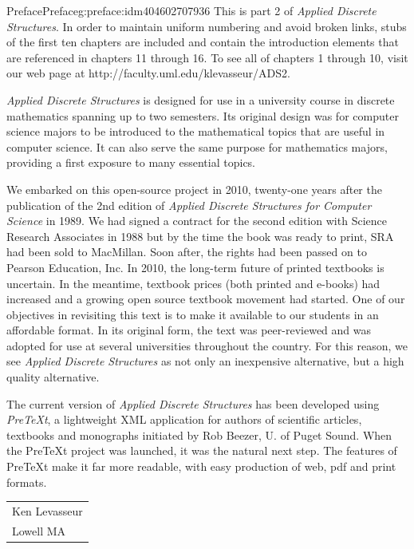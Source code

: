 \documentclass[twoside,10pt,]{book}
\numberwithin{equation}{section}
\begin{document}
\begin{preface}{Preface}{}{Preface}{}{}{g:preface:idm404602707936}
This is part 2 of \emph{Applied Discrete Structures}.  In order to maintain uniform numbering and avoid broken links, stubs of the first ten chapters are included and contain the introduction  elements that are referenced in chapters 11 through 16.  To see all of chapters 1 through 10, visit our web page at http:\slash{}\slash{}faculty.uml.edu\slash{}klevasseur\slash{}ADS2.%
\par
\emph{Applied Discrete Structures} is designed for use in a university course in discrete mathematics spanning up to two semesters.   Its original design was for computer science majors to be introduced to the mathematical topics that are useful in computer science.   It can also serve the same purpose for mathematics majors, providing a first exposure to many essential topics.%
\par
We embarked on this open-source project in 2010, twenty-one years after the publication of the 2nd edition of \emph{Applied Discrete Structures for Computer Science} in 1989.   We had signed a contract for the second edition with Science Research Associates in 1988 but by the time the book was ready to print, SRA had been sold to MacMillan. Soon after, the rights had been passed on to Pearson Education, Inc. In 2010, the long-term future of printed textbooks is uncertain. In the meantime, textbook prices (both printed and e-books) had increased and a growing open source textbook movement had started. One of our objectives in revisiting this text is to make it available to our students in an affordable format. In its original form, the text was peer-reviewed and was adopted for use at several universities throughout the country. For this reason, we see \emph{Applied Discrete Structures} as not only an inexpensive alternative, but a high quality alternative.%
\par
The current version of \emph{Applied Discrete Structures} has been developed using \emph{PreTeXt}, a lightweight XML application for authors of scientific articles, textbooks and monographs initiated by Rob Beezer, U. of Puget Sound.  When the PreTeXt project was launched, it was the natural next step.  The features of PreTeXt make it far more readable, with easy production of web, pdf and print formats.%
\nopagebreak\par%
\hfill\begin{tabular}[t]{l@{}}
Ken Levasseur\\
Lowell MA
\end{tabular}\\\par
\end{preface}
\end{document}

